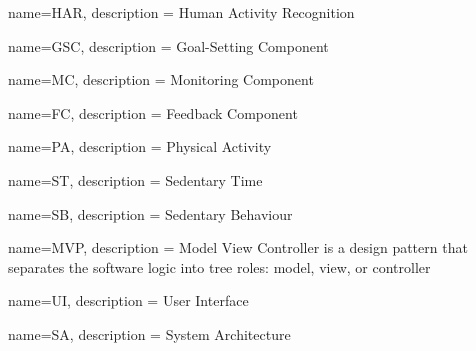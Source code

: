 
{
  name=HAR,
  description = {Human Activity Recognition}
}

{
    name=GSC,
    description = {Goal-Setting Component}
}

{
    name=MC,
    description = {Monitoring Component}
}

{
    name=FC,
    description = {Feedback Component}
}

{
    name=PA,
    description = {Physical Activity}
}

{
    name=ST,
    description = {Sedentary Time}
}

{
    name=SB,
    description = {Sedentary Behaviour}
}

{
    name=MVP,
    description = {Model View Controller is a design pattern that separates the software logic into tree roles: model, view, or controller}
}

{
    name=UI,
    description = {User Interface}
}

{
    name=SA,
    description = {System Architecture}
}

\glsaddall %
\printglossaries